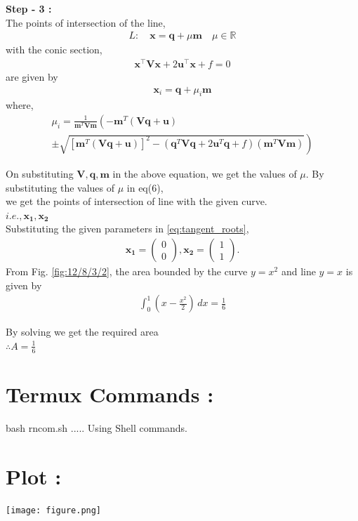 \documentclass[10pt,a4paper]{report}
\newcommand{\myvec}[1]{\ensuremath{\begin{pmatrix}#1\end{pmatrix}}}
\let\vec\mathbf
\providecommand{\brak}[1]{\ensuremath{\left(#1\right)}}
\providecommand{\lbrak}[1]{\ensuremath{\left(#1\right.}}
\providecommand{\rbrak}[1]{\ensuremath{\left.#1\right)}}
\providecommand{\sbrak}[1]{\ensuremath{{}\left[#1\right]}}
\begin{document}
\begin{multicols}{2}
\raggedright \textbf{Step - 3 :}\\ \vspace{2mm}
The points of intersection of the line, \\ 
\begin{align}
L: \quad \vec{x} = \vec{q} + \mu \vec{m} \quad \mu \in \mathbb{R}
\end{align}
with the conic section, \\ 
\begin{align}
	\vec{x}^{\top}\vec{V}\vec{x} + 2\vec{u}^{\top} \vec{x} + f = 0
\end{align}
are given by \\
\begin{align}
\vec{x}_i = \vec{q} + \mu_i \vec{m}
\end{align}
where, \\
{\tiny
\begin{multline}
\mu_i = \frac{1}
{
\vec{m}^T\vec{V}\vec{m}
}
\lbrak{-\vec{m}^T\brak{\vec{V}\vec{q}+\vec{u}}}
\\
\pm
\rbrak{\sqrt{
\sbrak{
\vec{m}^T\brak{\vec{V}\vec{q}+\vec{u}}
}^2
-
\brak
{
\vec{q}^T\vec{V}\vec{q} + 2\vec{u}^T\vec{q} +f
}
\brak{\vec{m}^T\vec{V}\vec{m}}
}
}
\end{multline}
}
\raggedright On substituting $\vec{V},\vec{q} ,\vec{m}$ in the above equation,
we get the values of $\mu$. By substituting the values of $\mu$ in eq(6), \\we get the points of intersection of line with the given curve. \\
\centering $i.e., \vec{x_1},\vec{x_2}$\\ 
\fi
Substituting the given parameters in 
\eqref{eq:tangent_roots},
\begin{align}
\vec{x_1}=\myvec{0\\0}, \vec{x_2}=\myvec{1\\1}.
\end{align}
From Fig. 
		\ref{fig:12/8/3/2},
the area bounded by the curve $y=x^2$ and line $y=x$ is given by
\begin{align}
	\int_{0}^{1} \brak{x 
	-\frac{x^2}{2}} \,dx = \frac{1}{6}
\end{align}
\iffalse

\centering By solving we get the required area\\
$\therefore A = \frac{1}{6}$ 



\section{Termux Commands :}
\centering bash rncom.sh ..... Using Shell commands.


\section{Plot :} 
\begin{center}
  \texttt{[image: figure.png]}
  	\end{center}

 
\end{multicols}
\end{document}
